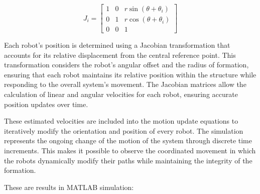 \[
J_i =
\begin{bmatrix}
1 & 0 & r \sin(\theta + \theta_i) \\
0 & 1 & r \cos(\theta + \theta_i) \\
0 & 0 & 1
\end{bmatrix}
\]

Each robot's position is determined using a Jacobian transformation that accounts for its relative displacement from the central reference point. This transformation considers the robot's angular offset and the radius of formation, ensuring that each robot maintains its relative position within the structure while responding to the overall system's movement. The Jacobian matrices allow the calculation of linear and angular velocities for each robot, ensuring accurate position updates over time.

These estimated velocities are included into the motion update equations to iteratively modify the orientation and position of every robot. The simulation represents the ongoing change of the motion of the system through discrete time increments. This makes it possible to observe the coordinated movement in which the robots dynamically modify their paths while maintaining the integrity of the formation.

These are results in MATLAB simulation:

